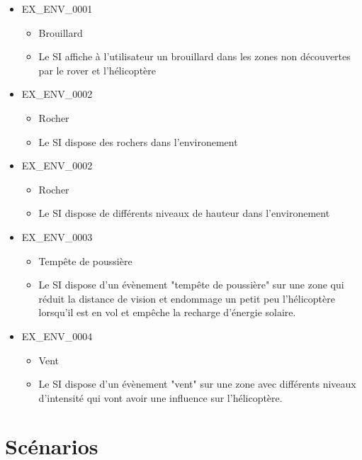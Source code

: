 \documentclass[12pt,a4paper]{scrartcl}
\begin{document}
\begin{itemize}

\item EX\_ENV\_0001
\begin{itemize}
\item Brouillard
\item Le SI affiche à l'utilisateur un brouillard dans les zones non découvertes par le rover et l'hélicoptère
\end{itemize}

\item EX\_ENV\_0002
\begin{itemize}
\item Rocher
\item Le SI dispose des rochers dans l'environement
\end{itemize}

\item EX\_ENV\_0002
\begin{itemize}
\item Rocher
\item Le SI dispose de différents niveaux de hauteur dans l'environement
\end{itemize}

\item EX\_ENV\_0003
\begin{itemize}
\item Tempête de poussière
\item Le SI dispose d'un évènement "tempête de poussière" sur une zone qui
		réduit la distance de vision et endommage un petit peu l'hélicoptère
		lorsqu'il est en vol et empêche la recharge d'énergie solaire.
\end{itemize}

\item EX\_ENV\_0004
\begin{itemize}
\item Vent
\item Le SI dispose d'un évènement "vent" sur une zone avec différents niveaux d'intensité qui vont avoir une influence sur l'hélicoptère.
\end{itemize}

\end{itemize}

\section {Scénarios}
\end{document}
